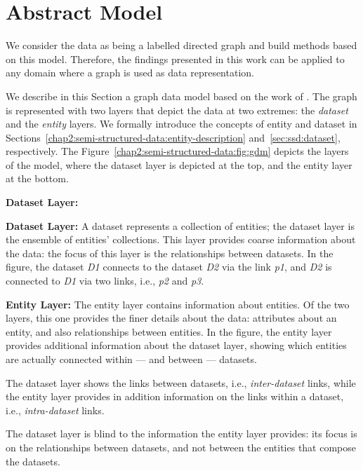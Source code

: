 \section{Abstract Model}
\label{chap2:semi-structured-data:gdm:abstract-model}

We consider the data as being a labelled directed graph and build methods based on this model. Therefore, the findings presented in this work can be applied to any domain where a graph is used as data representation.

We describe in this Section a graph data model based on the work of \cite{delbru:jws:entity}. The graph is represented with two layers that depict the data at two extremes: the \emph{dataset} and the \emph{entity} layers. We formally introduce the concepts of entity and dataset in Sections~\ref{chap2:semi-structured-data:entity-description} and~\ref{sec:ssd:dataset}, respectively. The Figure~\ref{chap2:semi-structured-data:fig:gdm} depicts the layers of the model, where the dataset layer is depicted at the top, and the entity layer at the bottom.
\begin{labeling}{\textbf{Dataset Layer:}}
	\item[\textbf{Dataset Layer:}] A dataset represents a collection of entities; the dataset layer is the ensemble of entities' collections. This layer provides coarse information about the data: the focus of this layer is the relationships between datasets. In the figure, the dataset \emph{D1} connects to the dataset \emph{D2} via the link \emph{p1}, and \emph{D2} is connected to \emph{D1} via two links, i.e., \emph{p2} and \emph{p3}.
	\item[\textbf{Entity Layer:}] The entity layer contains information about entities. Of the two layers, this one provides the finer details about the data: attributes about an entity, and also relationships between entities. In the figure, the entity layer provides additional information about the dataset layer, showing which entities are actually connected within --- and between --- datasets.
\end{labeling}

The dataset layer shows the links between datasets, i.e., \emph{inter-dataset} links, while the entity layer provides in addition information on the links within a dataset, i.e., \emph{intra-dataset} links.

The dataset layer is blind to the information the entity layer provides: its focus is on the relationships between datasets, and not between the entities that compose the datasets.

